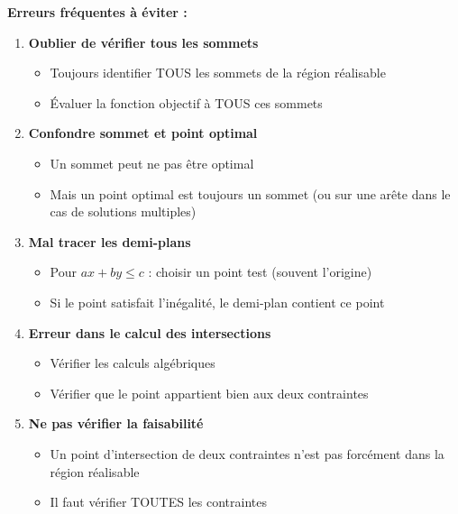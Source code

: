 \documentclass[12pt,a4paper]{article}
\begin{document}
\begin{important}
\textbf{Erreurs fréquentes à éviter :}

\begin{enumerate}
    \item \textcolor{importantrouge}{\textbf{Oublier de vérifier tous les sommets}}
    \begin{itemize}
        \item Toujours identifier TOUS les sommets de la région réalisable
        \item Évaluer la fonction objectif à TOUS ces sommets
    \end{itemize}
    
    \item \textcolor{importantrouge}{\textbf{Confondre sommet et point optimal}}
    \begin{itemize}
        \item Un sommet peut ne pas être optimal
        \item Mais un point optimal est toujours un sommet (ou sur une arête dans le cas de solutions multiples)
    \end{itemize}
    
    \item \textcolor{importantrouge}{\textbf{Mal tracer les demi-plans}}
    \begin{itemize}
        \item Pour $ax + by \leq c$ : choisir un point test (souvent l'origine)
        \item Si le point satisfait l'inégalité, le demi-plan contient ce point
    \end{itemize}
    
    \item \textcolor{importantrouge}{\textbf{Erreur dans le calcul des intersections}}
    \begin{itemize}
        \item Vérifier les calculs algébriques
        \item Vérifier que le point appartient bien aux deux contraintes
    \end{itemize}
    
    \item \textcolor{importantrouge}{\textbf{Ne pas vérifier la faisabilité}}
    \begin{itemize}
        \item Un point d'intersection de deux contraintes n'est pas forcément dans la région réalisable
        \item Il faut vérifier TOUTES les contraintes
    \end{itemize}
\end{enumerate}
\end{important}
\end{document}
